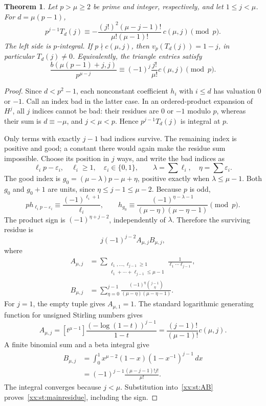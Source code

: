 \documentclass[11pt,a4paper]{article}
\numberwithin{equation}{section}
\newtheorem{theorem}{Theorem}[section]
\theoremstyle{definition}
\theoremstyle{remark}
\theoremstyle{plain}
\newcommand{\coef}[2]{[#1^{#2}]}
\begin{document}
\begin{theorem}\label{xx:st:residue}
Let $p>\mu\ge2$ be prime and integer, respectively, and let $1\le j<\mu$. For
$d=\mu(p-1)$,
\begin{equation}\label{xx:st:mainresidue}
 p^{j-1}T_d(j)\equiv
 -\frac{(j!)^2(\mu-j-1)!}{\mu!(\mu-1)!}\,c(\mu,j)\pmod p.
\end{equation}
The left side is $p$-integral. If $p\nmid c(\mu,j)$, then
$v_p(T_d(j))=1-j$, in particular $T_d(j)\ne0$.
Equivalently, the triangle entries satisfy
\begin{equation}\label{xx:st:triangleresidue}
 \frac{b(\mu(p-1)+j,j)}{p^{\mu-j}}
 \equiv(-1)^j\frac{j!}{\mu!}c(\mu,j)\pmod p.
\end{equation}
\end{theorem}
\begin{proof}
Since $d<p^2-1$, each nonconstant coefficient $h_i$ with $i\le d$ has valuation
$0$ or $-1$. Call an index bad in the latter case. In an ordered-product
expansion of $H^j$, all $j$ indices cannot be bad: their residues are $0$ or
$-1$ modulo $p$, whereas their sum is $d\equiv-\mu$, and $j<\mu<p$. Hence
$p^{j-1}T_d(j)$ is integral at $p$.

Only terms with exactly $j-1$ bad indices survive. The remaining index is
positive and good; a constant there would again make the residue sum
impossible. Choose its position in $j$ ways, and write the bad indices as
\[
 \ell_i p-\varepsilon_i,\quad \ell_i\ge1,\quad \varepsilon_i\in\{0,1\},\qquad
 \lambda=\sum\ell_i,\quad \eta=\sum\varepsilon_i.
\]
The good index is $g_0=(\mu-\lambda)p-\mu+\eta$, positive exactly when
$\lambda\le\mu-1$. Both $g_0$ and $g_0+1$ are units, since
$\eta\le j-1\le\mu-2$. Because $p$ is odd,
\[
 ph_{\ell_i p-\varepsilon_i}\equiv\frac{(-1)^{\ell_i+1}}{\ell_i},\qquad
 h_{g_0}\equiv\frac{(-1)^{\eta-\lambda-1}}{(\mu-\eta)(\mu-\eta-1)}\pmod p.
\]
The product sign is $(-1)^{\eta+j-2}$, independently of $\lambda$. Therefore
the surviving residue is
\begin{equation}\label{xx:st:AB}
 j(-1)^{j-2} A_{\mu,j} B_{\mu,j},
\end{equation}
where
\begin{align*}
 A_{\mu,j}&=\sum_{\substack{\ell_1,\ldots,\ell_{j-1}\ge1\\\ell_1+\cdots+\ell_{j-1}\le \mu-1}}
 \frac1{\ell_1\cdots\ell_{j-1}},\\
 B_{\mu,j}&=\sum_{\eta=0}^{j-1}\frac{(-1)^\eta\binom{j-1}\eta}{(\mu-\eta)(\mu-\eta-1)}.
\end{align*}
For $j=1$, the empty tuple gives $A_{\mu,1}=1$.
The standard logarithmic generating function for unsigned Stirling numbers
gives
\[
 A_{\mu,j}=\coef{t}{\mu-1}\frac{(-\log(1-t))^{j-1}}{1-t}
 =\frac{(j-1)!}{(\mu-1)!}c(\mu,j).
\]
A finite binomial sum and a beta integral give
\begin{align*}
 B_{\mu,j}
 &=\int_0^1x^{\mu-2}(1-x)(1-x^{-1})^{j-1}\,dx\\
 &=(-1)^{j-1}\frac{(\mu-j-1)!j!}{\mu!}.
\end{align*}
The integral converges because $j<\mu$. Substitution into~\eqref{xx:st:AB}
proves~\eqref{xx:st:mainresidue}, including the sign.


\end{proof}
\end{document}

